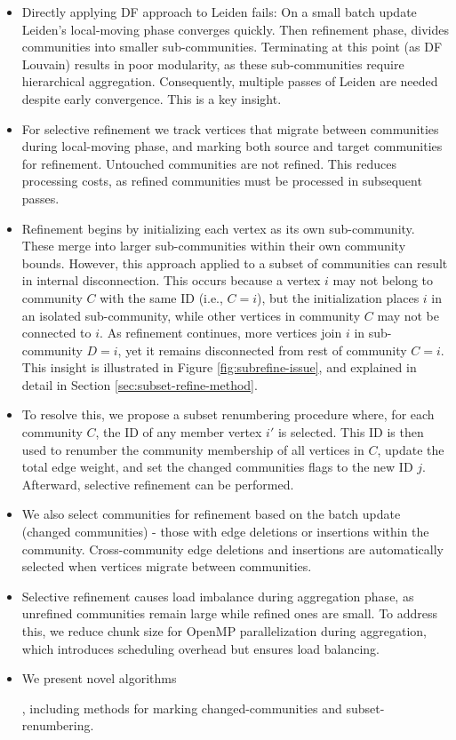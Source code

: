\begin{itemize}
  \item Directly applying DF approach \cite{sahu2024shared} to Leiden fails: On a small batch update Leiden's local-moving phase converges quickly. Then refinement phase, divides communities into smaller sub-communities. Terminating at this point (as DF Louvain) results in poor modularity, as these sub-communities require hierarchical aggregation. Consequently, multiple passes of Leiden are needed despite early convergence. This is a key insight.
  \item For selective refinement we track vertices that migrate between communities during local-moving phase, and marking both source and target communities for refinement. Untouched communities are not refined. This reduces processing costs, as refined communities must be processed in subsequent passes.
  \item Refinement begins by initializing each vertex as its own sub-community. These merge into larger sub-communities within their own community bounds. However, this approach applied to a subset of communities can result in internal disconnection. This occurs because a vertex $i$ may not belong to community $C$ with the same ID (i.e., $C = i$), but the initialization places $i$ in an isolated sub-community, while other vertices in community $C$ may not be connected to $i$. As refinement continues, more vertices join $i$ in sub-community $D = i$, yet it remains disconnected from rest of community $C = i$. This insight is illustrated in Figure \ref{fig:subrefine-issue}, and explained in detail in Section \ref{sec:subset-refine-method}.
  \item To resolve this, we propose a subset renumbering procedure where, for each community $C$, the ID of any member vertex $i'$ is selected. This ID is then used to renumber the community membership of all vertices in $C$, update the total edge weight, and set the changed communities flags to the new ID $j$. Afterward, selective refinement can be performed.
  \item We also select communities for refinement based on the batch update (changed communities) - those with edge deletions or insertions within the community. Cross-community edge deletions and insertions are automatically selected when vertices migrate between communities.
  \item Selective refinement causes load imbalance during aggregation phase, as unrefined communities remain large while refined ones are small. To address this, we reduce chunk size for OpenMP parallelization during aggregation, which introduces scheduling overhead but ensures load balancing.
  \item We present novel algorithms, including methods for marking changed-communities and subset-renumbering.
\end{itemize}

